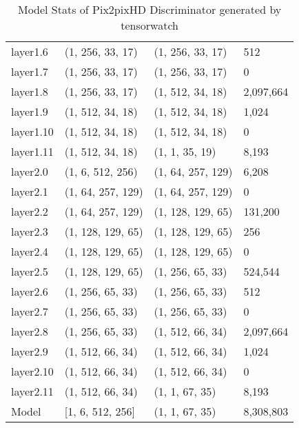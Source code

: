 \begin{table}[H]
\begin{tabular}{llll}
        layer1.6 &   (1, 256, 33, 17) &   (1, 256, 33, 17) &        512 \\
        layer1.7 &   (1, 256, 33, 17) &   (1, 256, 33, 17) &          0 \\
        layer1.8 &   (1, 256, 33, 17) &   (1, 512, 34, 18) &  2,097,664 \\
        layer1.9 &   (1, 512, 34, 18) &   (1, 512, 34, 18) &      1,024 \\
        layer1.10 &   (1, 512, 34, 18) &   (1, 512, 34, 18) &          0 \\
        layer1.11 &   (1, 512, 34, 18) &     (1, 1, 35, 19) &      8,193 \\
        layer2.0 &   (1, 6, 512, 256) &  (1, 64, 257, 129) &      6,208 \\
        layer2.1 &  (1, 64, 257, 129) &  (1, 64, 257, 129) &          0 \\
        layer2.2 &  (1, 64, 257, 129) &  (1, 128, 129, 65) &    131,200 \\
        layer2.3 &  (1, 128, 129, 65) &  (1, 128, 129, 65) &        256 \\
        layer2.4 &  (1, 128, 129, 65) &  (1, 128, 129, 65) &          0 \\
        layer2.5 &  (1, 128, 129, 65) &   (1, 256, 65, 33) &    524,544 \\
        layer2.6 &   (1, 256, 65, 33) &   (1, 256, 65, 33) &        512 \\
        layer2.7 &   (1, 256, 65, 33) &   (1, 256, 65, 33) &          0 \\
        layer2.8 &   (1, 256, 65, 33) &   (1, 512, 66, 34) &  2,097,664 \\
        layer2.9 &   (1, 512, 66, 34) &   (1, 512, 66, 34) &      1,024 \\
        layer2.10 &   (1, 512, 66, 34) &   (1, 512, 66, 34) &          0 \\
        layer2.11 &   (1, 512, 66, 34) &     (1, 1, 67, 35) &      8,193 \\
            Model &   [1, 6, 512, 256] &     (1, 1, 67, 35) &  8,308,803 \\
        \bottomrule
    \end{tabular}
    \caption{Model Stats of Pix2pixHD Discriminator generated by tensorwatch}
    \label{Pix2pixHD discriminator table}
\end{table}
    
